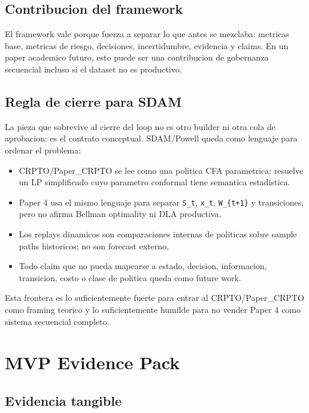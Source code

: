 \documentclass[
  spanish,
  11pt,
  letterpaper,
]{scrbook}
\providecommand{\tightlist}{%
  \setlength{\itemsep}{0pt}\setlength{\parskip}{0pt}}
\theoremstyle{plain}
\theoremstyle{remark}
\begin{document}
\section{Contribucion del framework}\label{contribucion-del-framework}

El framework vale porque fuerza a separar lo que antes se mezclaba:
metricas base, metricas de riesgo, decisiones, incertidumbre, evidencia
y claims. En un paper academico futuro, esto puede ser una contribucion
de gobernanza secuencial incluso si el dataset no es productivo.

\section{Regla de cierre para SDAM}\label{regla-de-cierre-para-sdam}

La pieza que sobrevive al cierre del loop no es otro builder ni otra
cola de aprobacion: es el contrato conceptual. SDAM/Powell queda como
lenguaje para ordenar el problema:

\begin{itemize}
\tightlist
\item
  CRPTO/Paper\_CRPTO se lee como una politica CFA parametrica: resuelve
  un LP simplificado cuyo parametro conformal tiene semantica
  estadistica.
\item
  Paper 4 usa el mismo lenguaje para separar \texttt{S\_t},
  \texttt{x\_t}, \texttt{W\_\{t+1\}} y transiciones, pero no afirma
  Bellman optimality ni DLA productiva.
\item
  Los replays dinamicos son comparaciones internas de politicas sobre
  sample paths historicos; no son forecast externo.
\item
  Todo claim que no pueda mapearse a estado, decision, informacion,
  transicion, costo o clase de politica queda como future work.
\end{itemize}

Esta frontera es lo suficientemente fuerte para entrar al
CRPTO/Paper\_CRPTO como framing teorico y lo suficientemente humilde
para no vender Paper 4 como sistema secuencial completo.

\chapter{MVP Evidence Pack}\label{mvp-evidence-pack}

\section{Evidencia tangible}\label{evidencia-tangible}
\end{document}
